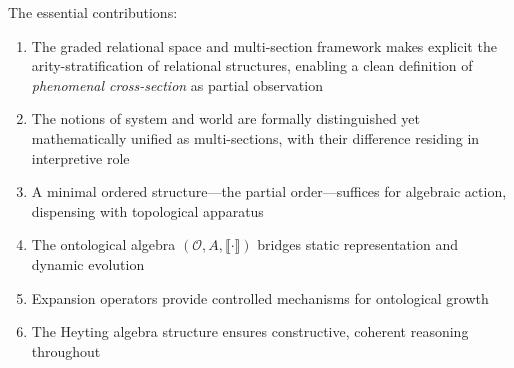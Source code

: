 \documentclass[12pt,a4paper]{article}
\newcommand{\domain}{\mathcal{D}}
\newcommand{\interp}{\mathcal{I}}
\newcommand{\concept}{\mathcal{C}}
\newcommand{\onto}{\mathcal{O}}
\newcommand{\intrel}{\mathfrak{R}}
\newcommand{\sem}[1]{\llbracket #1 \rrbracket}
\begin{document}
\begin{center}
\end{center}

The essential contributions:
\begin{enumerate}
    \item The graded relational space and multi-section framework makes explicit the arity-stratification of relational structures, enabling a clean definition of \emph{phenomenal cross-section} as partial observation
    \item The notions of system and world are formally distinguished yet mathematically unified as multi-sections, with their difference residing in interpretive role
    \item A minimal ordered structure---the partial order---suffices for algebraic action, dispensing with topological apparatus
    \item The ontological algebra $(\onto, A, \sem{\cdot})$ bridges static representation and dynamic evolution
    \item Expansion operators provide controlled mechanisms for ontological growth
    \item The Heyting algebra structure ensures constructive, coherent reasoning throughout
\end{enumerate}
\end{document}
